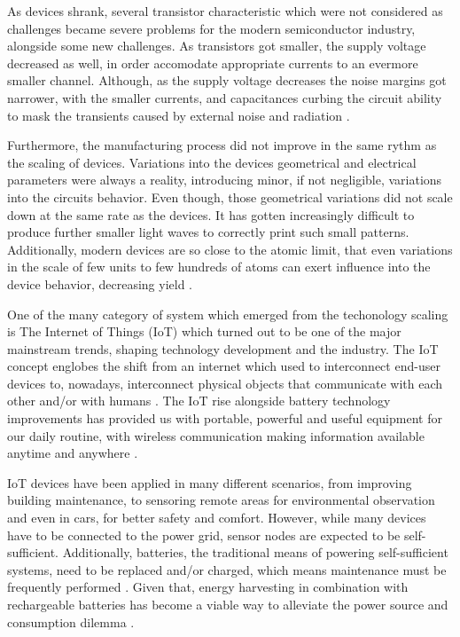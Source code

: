 \documentclass[pgmicro,mestrado,english]{iiufrgs}
\begin{document}
	As devices shrank, several transistor characteristic which were not considered as challenges became severe problems for the modern semiconductor industry, alongside some new challenges. As transistors got smaller, the supply voltage decreased as well, in order accomodate appropriate currents to an evermore smaller channel. Although, as the supply voltage decreases the noise margins got narrower, with the smaller currents, and capacitances curbing the circuit ability to mask the transients caused by external noise and radiation \cite{abbas:15}. 

	Furthermore, the manufacturing process did not improve in the same rythm as the scaling of devices. Variations into the devices geometrical and electrical parameters were always a reality, introducing minor, if not negligible, variations into the circuits behavior. Even though, those geometrical variations did not scale down at the same rate as the devices. It has gotten increasingly difficult to produce further smaller light waves to correctly print such small patterns. Additionally, modern devices are so close to the atomic limit, that even variations in the scale of few units to few hundreds of atoms can exert influence into the device behavior, decreasing yield \cite{abbas:15}.

    One of the many category of system which emerged from the techonology scaling is The Internet of Things (IoT) which turned out to be one of the major mainstream trends, shaping technology development and the industry. The IoT concept englobes the shift from an internet which used to interconnect end-user devices to, nowadays, interconnect physical objects that communicate with each other and/or with humans \cite{miorandi2012internet}. The IoT rise alongside battery technology improvements has provided us with portable, powerful and useful equipment for our daily routine, with wireless communication making information available anytime and anywhere \cite{manoli2010energy}.

    IoT devices have been applied in many different scenarios, from improving building maintenance, to sensoring remote areas for environmental observation and even in cars, for better safety and comfort. However, while many devices have to be connected to the power grid, sensor nodes are expected to be self-sufficient. Additionally, batteries, the traditional means of powering self-sufficient systems, need to be replaced and/or charged, which means maintenance must be frequently performed \cite{bleitner2018comparison}. Given that, energy harvesting in combination with rechargeable batteries has become a viable way to alleviate the power source and consumption dilemma \cite{manoli2010energy}.
\end{document}
